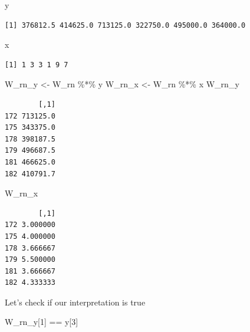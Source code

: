 \documentclass[
  letterpaper,
]{scrbook}
\newenvironment{Shaded}{\begin{snugshade}}{\end{snugshade}}
\newcommand{\DecValTok}[1]{\textcolor[rgb]{0.68,0.00,0.00}{#1}}
\newcommand{\NormalTok}[1]{\textcolor[rgb]{0.00,0.23,0.31}{#1}}
\newcommand{\OtherTok}[1]{\textcolor[rgb]{0.00,0.23,0.31}{#1}}
\newcommand{\SpecialCharTok}[1]{\textcolor[rgb]{0.37,0.37,0.37}{#1}}
\begin{document}
\begin{Shaded}
\begin{Highlighting}[]
\NormalTok{y}
\end{Highlighting}
\end{Shaded}

\begin{verbatim}
[1] 376812.5 414625.0 713125.0 322750.0 495000.0 364000.0
\end{verbatim}

\begin{Shaded}
\begin{Highlighting}[]
\NormalTok{x}
\end{Highlighting}
\end{Shaded}

\begin{verbatim}
[1] 1 3 3 1 9 7
\end{verbatim}

\begin{Shaded}
\begin{Highlighting}[]
\NormalTok{W\_rn\_y }\OtherTok{\textless{}{-}}\NormalTok{ W\_rn }\SpecialCharTok{\%*\%}\NormalTok{ y}
\NormalTok{W\_rn\_x }\OtherTok{\textless{}{-}}\NormalTok{ W\_rn }\SpecialCharTok{\%*\%}\NormalTok{ x}
\NormalTok{W\_rn\_y}
\end{Highlighting}
\end{Shaded}

\begin{verbatim}
        [,1]
172 713125.0
175 343375.0
178 398187.5
179 496687.5
181 466625.0
182 410791.7
\end{verbatim}

\begin{Shaded}
\begin{Highlighting}[]
\NormalTok{W\_rn\_x}
\end{Highlighting}
\end{Shaded}

\begin{verbatim}
        [,1]
172 3.000000
175 4.000000
178 3.666667
179 5.500000
181 3.666667
182 4.333333
\end{verbatim}

Let's check if our interpretation is true

\begin{Shaded}
\begin{Highlighting}[]
\NormalTok{W\_rn\_y[}\DecValTok{1}\NormalTok{] }\SpecialCharTok{==}\NormalTok{ y[}\DecValTok{3}\NormalTok{]}
\end{Highlighting}
\end{Shaded}
\end{document}

